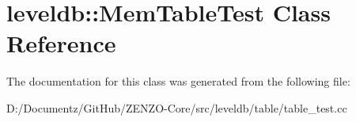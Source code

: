 \hypertarget{classleveldb_1_1_mem_table_test}{}\section{leveldb\+::Mem\+Table\+Test Class Reference}
\label{classleveldb_1_1_mem_table_test}


The documentation for this class was generated from the following file\+:\begin{DoxyCompactItemize}
\item 
D\+:/\+Documentz/\+Git\+Hub/\+Z\+E\+N\+Z\+O-\/\+Core/src/leveldb/table/table\+\_\+test.\+cc\end{DoxyCompactItemize}
